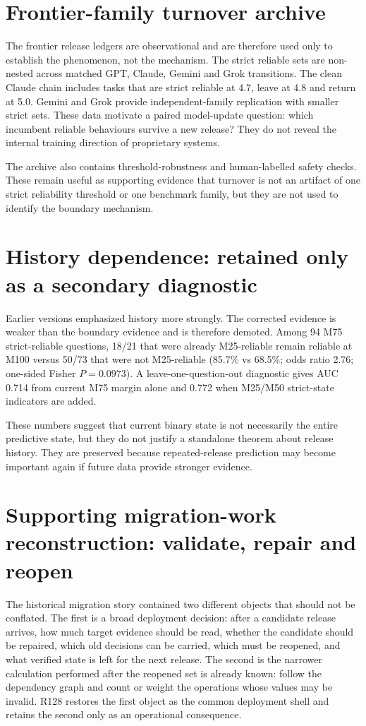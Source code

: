 \documentclass[11pt,letterpaper]{article}
\theoremstyle{plain}
\newcommand{\1}{\mathbf 1}
\begin{document}
\section{Frontier-family turnover archive}
The frontier release ledgers are observational and are therefore used only to establish the phenomenon, not the mechanism. The strict reliable sets are non-nested across matched GPT, Claude, Gemini and Grok transitions. The clean Claude chain includes tasks that are strict reliable at 4.7, leave at 4.8 and return at 5.0. Gemini and Grok provide independent-family replication with smaller strict sets. These data motivate a paired model-update question: which incumbent reliable behaviours survive a new release? They do not reveal the internal training direction of proprietary systems.

The archive also contains threshold-robustness and human-labelled safety checks. These remain useful as supporting evidence that turnover is not an artifact of one strict reliability threshold or one benchmark family, but they are not used to identify the boundary mechanism.

\section{History dependence: retained only as a secondary diagnostic}
Earlier versions emphasized history more strongly. The corrected evidence is weaker than the boundary evidence and is therefore demoted. Among 94 M75 strict-reliable questions, 18/21 that were already M25-reliable remain reliable at M100 versus 50/73 that were not M25-reliable (85.7\% vs 68.5\%; odds ratio 2.76; one-sided Fisher $P=0.0973$). A leave-one-question-out diagnostic gives AUC 0.714 from current M75 margin alone and 0.772 when M25/M50 strict-state indicators are added.

These numbers suggest that current binary state is not necessarily the entire predictive state, but they do not justify a standalone theorem about release history. They are preserved because repeated-release prediction may become important again if future data provide stronger evidence.

\section{Supporting migration-work reconstruction: validate, repair and reopen}
The historical migration story contained two different objects that should not be conflated. The first is a broad deployment decision: after a candidate release arrives, how much target evidence should be read, whether the candidate should be repaired, which old decisions can be carried, which must be reopened, and what verified state is left for the next release. The second is the narrower calculation performed after the reopened set is already known: follow the dependency graph and count or weight the operations whose values may be invalid. R128 restores the first object as the common deployment shell and retains the second only as an operational consequence.
\end{document}
